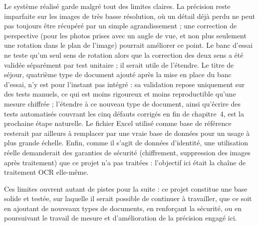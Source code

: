 Le système réalisé garde malgré tout des limites claires. La précision reste imparfaite sur les images de très basse résolution, où un détail déjà perdu ne peut pas toujours être récupéré par un simple agrandissement ; une correction de perspective (pour les photos prises avec un angle de vue, et non plus seulement une rotation dans le plan de l'image) pourrait améliorer ce point. Le banc d'essai ne teste qu'un seul sens de rotation alors que la correction des deux sens a été validée séparément par test unitaire ; il serait utile de l'étendre. Le titre de séjour, quatrième type de document ajouté après la mise en place du banc d'essai, n'y est pour l'instant pas intégré : sa validation repose uniquement sur des tests manuels, ce qui est moins rigoureux et moins reproductible qu'une mesure chiffrée ; l'étendre à ce nouveau type de document, ainsi qu'écrire des tests automatisés couvrant les cinq défauts corrigés en fin de chapitre~4, est la prochaine étape naturelle. Le fichier Excel utilisé comme base de référence resterait par ailleurs à remplacer par une vraie base de données pour un usage à plus grande échelle. Enfin, comme il s'agit de données d'identité, une utilisation réelle demanderait des garanties de sécurité (chiffrement, suppression des images après traitement) que ce projet n'a pas traitées : l'objectif ici était la chaîne de traitement OCR elle-même.

Ces limites ouvrent autant de pistes pour la suite : ce projet constitue une base solide et testée, sur laquelle il serait possible de continuer à travailler, que ce soit en ajoutant de nouveaux types de documents, en renforçant la sécurité, ou en poursuivant le travail de mesure et d'amélioration de la précision engagé ici.
